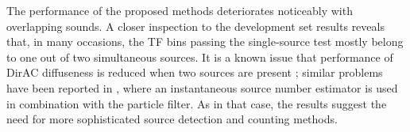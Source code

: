 The performance of the proposed methods deteriorates noticeably with overlapping sounds.
A closer inspection to the development set results reveals that, in many occasions, the TF bins passing the single-source test mostly belong to one out of two simultaneous sources. 
It is a known issue that performance of DirAC diffuseness is reduced when two sources are present \cite{epain2016spherical}; similar problems have been reported in \cite{adavanne2019localization}, where an instantaneous source number estimator is used in combination with the particle filter.
As in that case, the results suggest the need for more sophisticated source detection and counting methods. 







